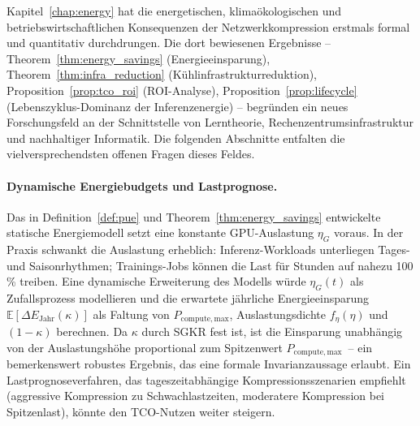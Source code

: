 \documentclass[12pt, a4paper, openany]{report}
\newcommand{\E}{\mathbb{E}}
\begin{document}
Kapitel~\ref{chap:energy} hat die energetischen, klimaökologischen und
betriebswirtschaftlichen Konsequenzen der Netzwerkkompression erstmals
formal und quantitativ durchdrungen.  Die dort bewiesenen Ergebnisse
-- Theorem~\ref{thm:energy_savings} (Energieeinsparung),
Theorem~\ref{thm:infra_reduction} (Kühlinfrastrukturreduktion),
Proposition~\ref{prop:tco_roi} (ROI-Analyse),
Proposition~\ref{prop:lifecycle} (Lebenszyklus-Dominanz der Inferenzenergie)
-- begründen ein neues Forschungsfeld an der Schnittstelle von
Lerntheorie, Rechenzentrumsinfrastruktur und nachhaltiger Informatik.
Die folgenden Abschnitte entfalten die vielversprechendsten offenen
Fragen dieses Feldes.

\paragraph{Dynamische Energiebudgets und Lastprognose.}
Das in Definition~\ref{def:pue} und Theorem~\ref{thm:energy_savings}
entwickelte statische Energiemodell setzt eine konstante GPU-Auslastung
$\eta_G$ voraus.  In der Praxis schwankt die Auslastung erheblich:
Inferenz-Workloads unterliegen Tages- und Saisonrhythmen; Trainings-Jobs
können die Last für Stunden auf nahezu 100\,\% treiben.  Eine dynamische
Erweiterung des Modells würde $\eta_G(t)$ als Zufallsprozess modellieren
und die erwartete jährliche Energieeinsparung
$\E[\Delta E_{\mathrm{Jahr}}(\kappa)]$ als Faltung von
$P_{\mathrm{compute,max}}$, Auslastungsdichte $f_{\eta}(\eta)$ und $(1-\kappa)$
berechnen.  Da $\kappa$ durch SGKR fest ist, ist die Einsparung
unabhängig von der Auslastungshöhe proportional zum Spitzenwert
$P_{\mathrm{compute,max}}$~-- ein bemerkenswert robustes Ergebnis, das eine
formale Invarianzaussage erlaubt.  Ein Lastprognoseverfahren, das
tageszeit\-abhängige Kompressions\-szenarien empfiehlt
(aggressive Kompression zu Schwachlastzeiten, moderatere Kompression
bei Spitzenlast), könnte den TCO-Nutzen weiter steigern.
\end{document}
